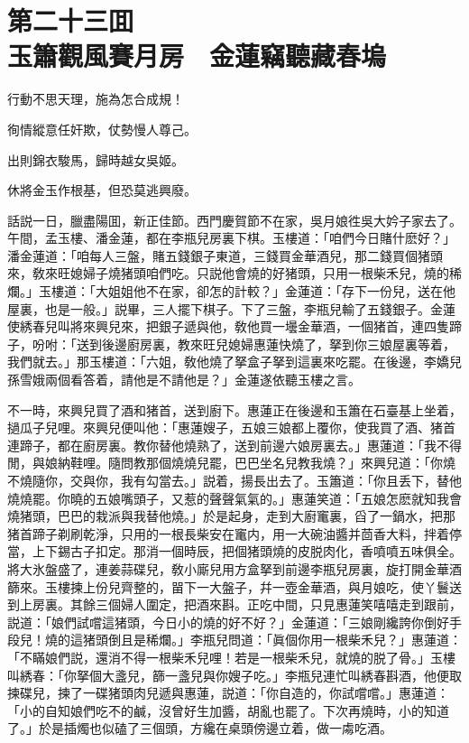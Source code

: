 
\chapter*{第二十三囬　\\玉簫觀風賽月房　金蓮竊聽藏春塢}


\begin{myquote}
行動不思天理，施為怎合成規！

徇情縱意任奸欺，仗勢慢人尊己。

出則錦衣駿馬，歸時越女吳姬。

休將金玉作根基，但恐莫逃興廢。
\end{myquote}

話説一日，臘盡陽囬，新正佳節。西門慶賀節不在家，吳月娘徃吳大妗子家去了。午間，孟玉樓、潘金蓮，都在李瓶兒房裏下棋。玉樓道：「咱們今日賭什麽好？」潘金蓮道：「咱每人三盤，賭五錢銀子東道，三錢買金華酒兒，那二錢買個猪頭來，敎來旺媳婦子燒猪頭咱們吃。只説他會燒的好猪頭，只用一根柴禾兒，燒的稀爛。」玉樓道：「大姐姐他不在家，卻怎的計較？」金蓮道：「存下一份兒，送在他屋裏，也是一般。」説畢，三人擺下棋子。下了三盤，李瓶兒輸了五錢銀子。金蓮使綉春兒叫將來興兒來，把銀子遞與他，敎他買一壜金華酒，一個猪首，連四隻蹄子，吩咐：「送到後邊廚房裏，教來旺兒媳婦惠蓮快燒了，拏到你三娘屋裏等着，我們就去。」那玉樓道：「六姐，敎他燒了拏盒子拏到這裏來吃罷。在後邊，李嬌兒孫雪娥兩個看答着，請他是不請他是？」金蓮遂依聽玉樓之言。

不一時，來興兒買了酒和猪首，送到廚下。惠蓮正在後邊和玉簫在石臺基上坐着，撾瓜子兒哩。來興兒便叫他：「惠蓮嫂子，五娘三娘都上覆你，使我買了酒、猪首連蹄子，都在廚房裏。教你替他燒熟了，送到前邊六娘房裏去。」惠蓮道：「我不得閒，與娘納鞋哩。隨問教那個燒燒兒罷，巴巴坐名兒教我燒？」來興兒道：「你燒不燒隨你，交與你，我有勾當去。」説着，揚長出去了。玉簫道：「你且丢下，替他燒燒罷。你曉的五娘嘴頭子，又惹的聲聲氣氣的。」惠蓮笑道：「五娘怎麽就知我會燒猪頭，巴巴的栽派與我替他燒。」於是起身，走到大廚竃裏，舀了一鍋水，把那猪首蹄子剃刷乾淨，只用的一根長柴安在竃内，用一大碗油醬并茴香大料，拌着停當，上下錫古子扣定。那消一個時辰，把個猪頭燒的皮脱肉化，香噴噴五味俱全。將大氷盤盛了，連姜蒜碟兒，敎小廝兒用方盒拏到前邊李瓶兒房裏，旋打開金華酒篩來。玉樓揀上份兒齊整的，㽞下一大盤子，幷一壺金華酒，與月娘吃，使丫鬟送到上房裏。其餘三個婦人圍定，把酒來斟。正吃中間，只見惠蓮笑嘻嘻走到跟前，説道：「娘們試嚐這猪頭，今日小的燒的好不好？」金蓮道：「三娘剛纔誇你倒好手段兒！燒的這猪頭倒且是稀爛。」李瓶兒問道：「眞個你用一根柴禾兒？」惠蓮道：「不瞞娘們説，還消不得一根柴禾兒哩！若是一根柴禾兒，就燒的脱了骨。」玉樓叫綉春：「你拏個大盞兒，篩一盞兒與你嫂子吃。」李瓶兒連忙叫綉春斟酒，他便取揀碟兒，揀了一碟猪頭肉兒遞與惠蓮，説道：「你自造的，你試嚐嚐。」惠蓮道：「小的自知娘們吃不的鹹，沒曾好生加醬，胡亂也罷了。下次再燒時，小的知道了。」於是插燭也似磕了三個頭，方纔在桌頭傍邊立着，做一䖏吃酒。

